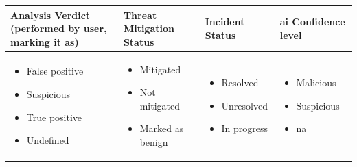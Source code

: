 \begin{longtable}{|p{4cm}|p{4cm}|p{4cm}|p{4cm}|}
      \hline
      \rowcolor{blue!20}
      Analysis Verdict (performed by user, marking it as) & Threat Mitigation Status & Incident Status & \acrshort{ai} Confidence level \\
      \endfirsthead
      \hline
      \begin{itemize}
            \item False positive
            \item Suspicious
            \item True positive
            \item Undefined
      \end{itemize}                                &
      \begin{itemize}
            \item Mitigated
            \item Not mitigated
            \item Marked as benign
      \end{itemize}                              &
      \begin{itemize}
            \item Resolved
            \item Unresolved
            \item In progress
      \end{itemize}                                   &
      \begin{itemize}
            \item Malicious
            \item Suspicious
            \item \acrshort{na}
      \end{itemize}                                                                                                                \\
      \hline
\end{longtable}
